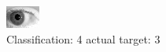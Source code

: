 \begin{figure}[h!]
\begin{center}
\includegraphics[width=0.60\columnwidth]{figures/ID254_class_4_target_3.png}
\end{center}
\caption{ Classification: 4 actual target: 3}
\label{fig:ID254_class_4_target_3}
\end{figure}
